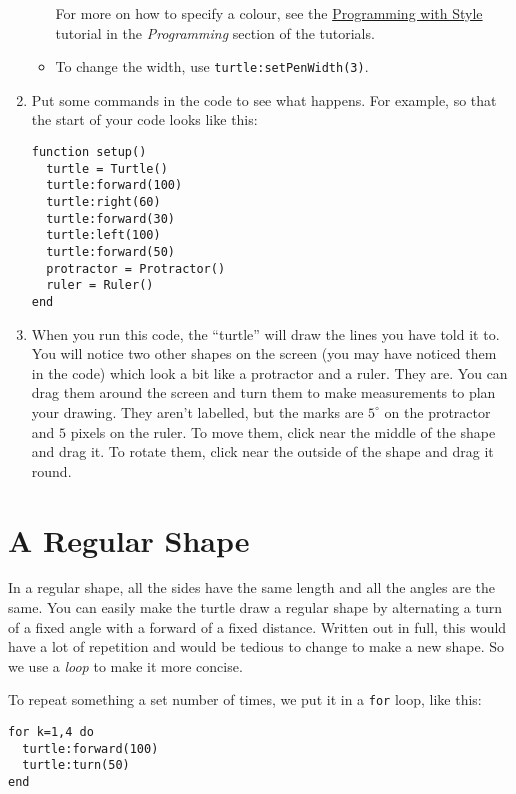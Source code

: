 \documentclass[
  xhtml,%
  use filename%
]{internet}
\begin{document}
\begin{enumerate}
\begin{itemize}
For more on how to specify a colour, see the \href{Style.xhtml}{Programming with Style} tutorial in the \emph{Programming} section of the tutorials.

\item To change the width, use \verb+turtle:setPenWidth(3)+.

\end{itemize}

\item Put some commands in the code to see what happens.
For example, so that the start of your code looks like this:

\begin{verbatim}
function setup()
  turtle = Turtle()
  turtle:forward(100)
  turtle:right(60)
  turtle:forward(30)
  turtle:left(100)
  turtle:forward(50)
  protractor = Protractor()
  ruler = Ruler()
end
\end{verbatim}

\item When you run this code, the ``turtle'' will draw the lines you have told it to.
You will notice two other shapes on the screen (you may have noticed them in the code) which look a bit like a protractor and a ruler.
They are.
You can drag them around the screen and turn them to make measurements to plan your drawing.
They aren't labelled, but the marks are \(5^\circ\) on the protractor and \(5\) pixels on the ruler.
To move them, click near the middle of the shape and drag it.
To rotate them, click near the outside of the shape and drag it round.

\end{enumerate}

\section{A Regular Shape}

In a regular shape, all the sides have the same length and all the angles are the same.
You can easily make the turtle draw a regular shape by alternating a turn of a fixed angle with a forward of a fixed distance.
Written out in full, this would have a lot of repetition and would be tedious to change to make a new shape.
So we use a \emph{loop} to make it more concise.

To repeat something a set number of times, we put it in a \verb+for+ loop, like this:

\begin{verbatim}
for k=1,4 do
  turtle:forward(100)
  turtle:turn(50)
end
\end{verbatim}
\end{document}

